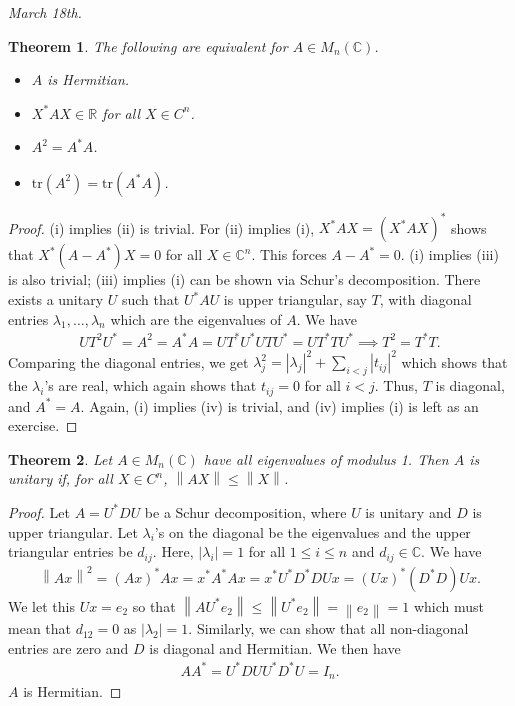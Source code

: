 \documentclass[15pt,a4paper]{book}
\newtheorem{theorem}{Theorem}[chapter]
\theoremstyle{definition}
\newcommand{\abs}[1]{\left| #1 \right|} %
\newcommand{\R}{\mathbb{R}}
\newcommand{\C}{\mathbb{C}}
\newcommand{\norm}[1]{\left\lVert#1\right\rVert}
\begin{document}
\textit{March 18th.}
\begin{theorem}
    The following are equivalent for $A \in M_{n}(\C)$.
    \begin{itemize}
        \item $A$ is Hermitian.
        \item $X^{\ast}AX \in \R$ for all $X \in C^{n}$.
        \item $A^{2} = A^{\ast}A$.
        \item $\text{tr}(A^{2}) = \text{tr}(A^{\ast}A)$.
    \end{itemize}
\end{theorem}
\begin{proof}
    (i) implies (ii) is trivial. For (ii) implies (i), $X^{\ast}AX = (X^{\ast}AX)^{\ast}$ shows that $X^{\ast}(A-A^{\ast})X = 0$ for all $X \in \C^{n}$. This forces $A-A^{\ast} = 0$. (i) implies (iii) is also trivial; (iii) implies (i) can be shown via Schur's decomposition. There exists a unitary $U$ such that $U^{\ast}AU$ is upper triangular, say $T$, with diagonal entries $\lambda_{1},\ldots,\lambda_{n}$ which are the eigenvalues of $A$. We have
    \begin{align}
        UT^{2}U^{\ast} = A^{2} = A^{\ast}A = UT^{\ast}U^{\ast}UTU^{\ast} = UT^{\ast}TU^{\ast} \implies T^{2} = T^{\ast}T.
    \end{align}
    Comparing the diagonal entries, we get $\lambda_{j}^{2} = \abs{\lambda_{j}}^{2} + \sum_{i < j} \abs{t_{ij}}^{2}$ which shows that the $\lambda_{i}$'s are real, which again shows that $t_{ij} = 0$ for all $i < j$. Thus, $T$ is diagonal, and $A^{\ast} = A$. Again, (i) implies (iv) is trivial, and (iv) implies (i) is left as an exercise.
\end{proof}

\begin{theorem}
    Let $A \in M_{n}(\C)$ have all eigenvalues of modulus 1. Then $A$ is unitary if, for all $X \in C^{n}$, $\norm{AX} \leq \norm{X}$.
\end{theorem}
\begin{proof}
    Let $A = U^{\ast}DU$ be a Schur decomposition, where $U$ is unitary and $D$ is upper triangular. Let $\lambda_{i}$'s on the diagonal be the eigenvalues and the upper triangular entries be $d_{ij}$. Here, $\abs{\lambda_{i}} = 1$ for all $1 \leq i \leq n$ and $d_{ij} \in \C$. We have
    \begin{align}
        \norm{Ax}^{2} = (Ax)^{\ast}Ax = x^{\ast}A^{\ast}Ax = x^{\ast}U^{\ast}D^{\ast}DUx = (Ux)^{\ast}(D^{\ast}D)Ux.
    \end{align}
    We let this $Ux = e_{2}$ so that $\norm{AU^{\ast}e_{2}} \leq \norm{U^{\ast}e_{2}} = \norm{e_{2}} = 1$ which must mean that $d_{12} = 0$ as $\abs{\lambda_{2}} = 1$. Similarly, we can show that all non-diagonal entries are zero and $D$ is diagonal and Hermitian. We then have
    \begin{align}
        AA^{\ast} = U^{\ast}DUU^{\ast}D^{\ast}U = I_{n}.
    \end{align}
    $A$ is Hermitian.
\end{proof}
\end{document}
